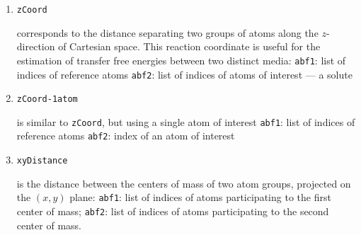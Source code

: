 \begin{itemize}
{\begin{enumerate}
\begin{minipage}[t]{10.0cm}
                    corresponds to the distance between the centers of mass
            of two sets of atoms along a given direction:
                    \newline
                    {\tt direction}: a vector (\tcl\ list of three real numbers)
                defining the direction of interest
                    \newline
                    {\tt abf1}: list of indices of atoms participating
                                to the first center of mass;
                    \newline
                    {\tt abf2}: list of indices of atoms participating
                                to the second center of mass.
 \end{minipage}
 \item
 {\tt zCoord} \hfill
 \begin{minipage}[t]{10.0cm}
                    corresponds to the distance separating two groups of atoms
                    along the $z$-direction of
                    Cartesian space. This reaction coordinate is
                    useful for the estimation of transfer free energies
                    between two distinct media:
                    \newline
                    {\tt abf1}: list of indices of reference atoms
                    \newline
                    {\tt abf2}: list of indices of atoms of interest ---
                                \eg a solute
 \end{minipage}
 \item
 {\tt zCoord-1atom} \hfill
 \begin{minipage}[t]{10.0cm}
                    is similar to {\tt zCoord}, but using a single
                    atom of interest
                    \newline
                    {\tt abf1}: list of indices of reference atoms
                    \newline
                    {\tt abf2}: index of an atom of interest
 \end{minipage}
 \item
 {\tt xyDistance} \hfill
 \begin{minipage}[t]{10.0cm}
                    is the distance between the centers of mass of
		    two atom groups, projected on
		    the $(x, y)$ plane:
                    \newline
                    {\tt abf1}: list of indices of atoms participating
                                to the first center of mass;
                    \newline
                    {\tt abf2}: list of indices of atoms participating
                                to the second center of mass.
 \end{minipage}
 \end{enumerate}
 }



\end{itemize}
